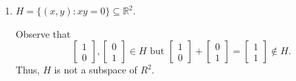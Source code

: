 \documentclass[letter]{article}
\newcommand{\R}{\mathbb{R}}
\newcommand{\mat}[1]{\begin{bmatrix}#1\end{bmatrix}}
\newenvironment{answer}{
	\begin{adjustwidth}{8mm}{} \vspace{2mm}}{\end{adjustwidth} \vspace{2mm}
}
\theoremstyle{plain}
\theoremstyle{definition}
\theoremstyle{remark}
\begin{document}
\begin{enumerate}
\begin{enumerate}
			\begin{answer}
				$G$ is the null space of the matrix
				\[
				\mat{1&1&0&-2\\0&3&0&0\\0&1&0&0}.
				\]
				All null spaces are subspaces, and therefore $G$ is a subspace of $\R^4$. 
			\end{answer}
			\item ${H}=\{(x,y): xy=0\}\subseteq \R^2$.
			\begin{answer}
				Observe that
				\[
				\mat{1\\0}, \mat{0\\1} \in H \text{ but } \mat{1\\0} + \mat{0\\1} = \mat{1\\1} \notin H.
				\]
				Thus, $H$ is not a subspace of $R^2$.
			\end{answer}
		\end{enumerate}


\end{enumerate}
\end{document}
